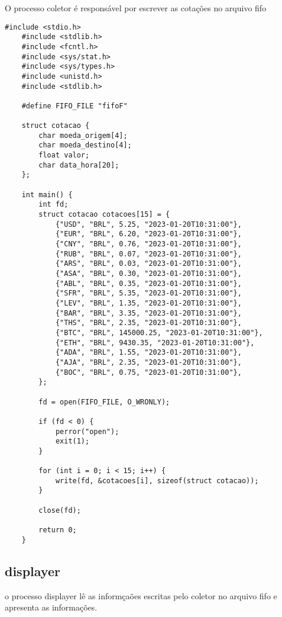 O processo coletor é responsável por escrever as cotações no arquivo fifo
\begin{lstlisting}[style=CStyle]
    #include <stdio.h>
    #include <stdlib.h>
    #include <fcntl.h>
    #include <sys/stat.h>
    #include <sys/types.h>
    #include <unistd.h>
    #include <stdlib.h>

    #define FIFO_FILE "fifoF"

    struct cotacao {
        char moeda_origem[4];
        char moeda_destino[4];
        float valor;
        char data_hora[20];
    };

    int main() {
        int fd;
        struct cotacao cotacoes[15] = {
            {"USD", "BRL", 5.25, "2023-01-20T10:31:00"},
            {"EUR", "BRL", 6.20, "2023-01-20T10:31:00"},
            {"CNY", "BRL", 0.76, "2023-01-20T10:31:00"},
            {"RUB", "BRL", 0.07, "2023-01-20T10:31:00"},
            {"ARS", "BRL", 0.03, "2023-01-20T10:31:00"},
            {"ASA", "BRL", 0.30, "2023-01-20T10:31:00"},
            {"ABL", "BRL", 0.35, "2023-01-20T10:31:00"},
            {"SFR", "BRL", 5.35, "2023-01-20T10:31:00"},
            {"LEV", "BRL", 1.35, "2023-01-20T10:31:00"},
            {"BAR", "BRL", 3.35, "2023-01-20T10:31:00"},
            {"THS", "BRL", 2.35, "2023-01-20T10:31:00"},
            {"BTC", "BRL", 145000.25, "2023-01-20T10:31:00"},
            {"ETH", "BRL", 9430.35, "2023-01-20T10:31:00"},
            {"ADA", "BRL", 1.55, "2023-01-20T10:31:00"},
            {"AJA", "BRL", 2.35, "2023-01-20T10:31:00"},
            {"BOC", "BRL", 0.75, "2023-01-20T10:31:00"},
        };

        fd = open(FIFO_FILE, O_WRONLY);

        if (fd < 0) {
            perror("open");
            exit(1);
        }

        for (int i = 0; i < 15; i++) {
            write(fd, &cotacoes[i], sizeof(struct cotacao));
        }

        close(fd);

        return 0;
    }
\end{lstlisting}

\subsection*{displayer}

o processo displayer lê as informçaões escritas pelo coletor no arquivo fifo e apresenta as informações.

